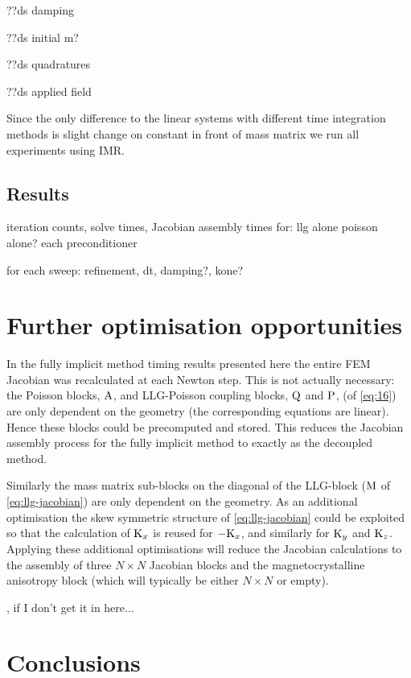 ??ds damping

??ds initial m?

??ds quadratures

??ds applied field

Since the only difference to the linear systems with different time integration methods is slight change on constant in front of mass matrix we run all experiments using IMR.


\subsection{Results}


iteration counts, solve times, Jacobian assembly times for:
llg alone
poisson alone?
each preconditioner

for each sweep: refinement, dt, damping?, kone?


\section{Further optimisation opportunities}

In the fully implicit method timing results presented here the entire FEM Jacobian was recalculated at each Newton step.
This is not actually necessary: the Poisson blocks, $\mathrm{A}$, and LLG-Poisson coupling blocks, $\mathrm{Q}$ and $\mathrm{P}$, (of \cref{eq:16}) are only dependent on the geometry (\ie the corresponding equations are linear).
Hence these blocks could be precomputed and stored.
This reduces the Jacobian assembly process for the fully implicit method to exactly as the decoupled method.

Similarly the mass matrix sub-blocks on the diagonal of the LLG-block ($\mathrm{M}$ of \cref{eq:llg-jacobian}) are only dependent on the geometry.
As an additional optimisation the skew symmetric structure of \cref{eq:llg-jacobian} could be exploited so that the calculation of $\mathrm{K}_x$ is reused for $-\mathrm{K}_x$, and similarly for $\mathrm{K}_y$ and $\mathrm{K}_z$.
Applying these additional optimisations will reduce the Jacobian calculations to the assembly of three $N \times N$ Jacobian blocks and the magnetocrystalline anisotropy block (which will typically be either $N \times N$ or empty).


\hlib, if I don't get it in here...



\section{Conclusions}

